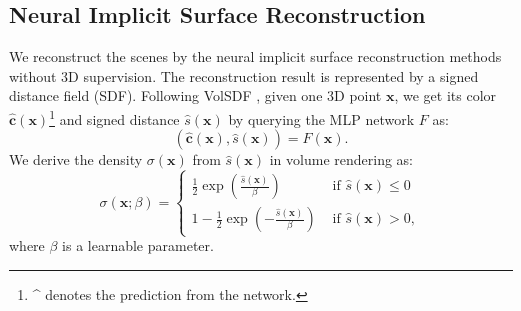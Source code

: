 \documentclass[10pt,journal,compsoc]{IEEEtran}
\begin{document}
	\subsection{Neural Implicit Surface Reconstruction}
	We reconstruct the scenes by the neural implicit surface reconstruction methods \cite{oechsle2021unisurf,wang2021neus,yariv2021volume} without 3D supervision. The reconstruction result is represented by a signed distance field (SDF). Following VolSDF \cite{yariv2021volume}, given one 3D point $\bm{x}$, we get its color $\mathbf{\hat{c}}(\bm{x})$\footnote{\^{} denotes the prediction from the network.} and signed distance $\hat{s}(\bm{x})$ by querying the MLP network $F$ as:
	\begin{equation}
		(\mathbf{\hat{c}}(\bm{x}), \hat{s}(\bm{x})) = F(\bm{x}).
	\end{equation}
	We derive the density $\sigma(\bm{x})$ from $\hat{s}(\bm{x})$ in volume rendering as:
	\begin{equation}
		\sigma(\bm{x};\beta)= \begin{cases}\frac{1}{2} \exp \left(\frac{\hat{s}(\bm{x})}{\beta}\right) & \text { if } \hat{s}(\bm{x}) \leq 0 \\ 1-\frac{1}{2} \exp \left(-\frac{\hat{s}(\bm{x})}{\beta}\right) & \text { if } \hat{s}(\bm{x})>0,\end{cases}
	\end{equation}
	where $\beta$ is a learnable parameter.
	
\end{document}
